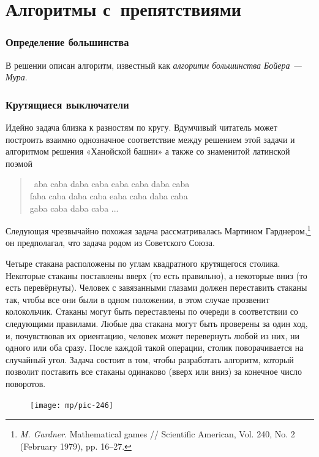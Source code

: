 \documentclass[twoside]{book}
\begin{document}
\section{Алгоритмы с~препятствиями}

\subsubsection*{Определение большинства}
В решении описан алгоритм, известный как \emph{алгоритм большинства Бойера --- Мура}. 


\subsubsection*{Крутящиеся выключатели}
Идейно задача близка к разностям по кругу.
Вдумчивый читатель может построить взаимно однозначное соответствие между решением этой задачи и алгоритмом решения «Ханойской башни» а также со знаменитой латинской поэмой
\begin{verse}
\ aba caba daba caba eaba caba daba caba\\
faba caba daba caba eaba caba daba caba\\
gaba caba daba caba ...
\end{verse}


Следующая чрезвычайно похожая задача рассматривалась Мартином Гарднером,\footnote{
\emph{M. Gardner}.
Mathematical games /\!/ Scientific American, Vol. 240, No. 2 (February 1979), pp. 16--27.}
он предполагал, что задача родом из Советского Союза. 

Четыре стакана расположены по углам квадратного крутящегося столика.
Некоторые стаканы поставлены вверх (то есть правильно), а некоторые вниз (то есть перевёрнуты). Человек с завязанными глазами должен переставить стаканы так, чтобы все они были в одном положении, в этом случае прозвенит колокольчик.
Стаканы могут быть переставлены по очереди в соответствии со следующими правилами.
Любые два стакана могут быть проверены за один ход, и, почувствовав их ориентацию, человек может перевернуть любой из них, ни одного или оба сразу.
После каждой такой операции, столик поворачивается на случайный угол.
Задача состоит в том, чтобы разработать алгоритм, который позволит 
поставить все стаканы одинаково (вверх или вниз) за конечное число поворотов.

\begin{figure}
\vskip-0mm
\centering
\texttt{[image: mp/pic-246]}
\end{figure}
\end{document}
